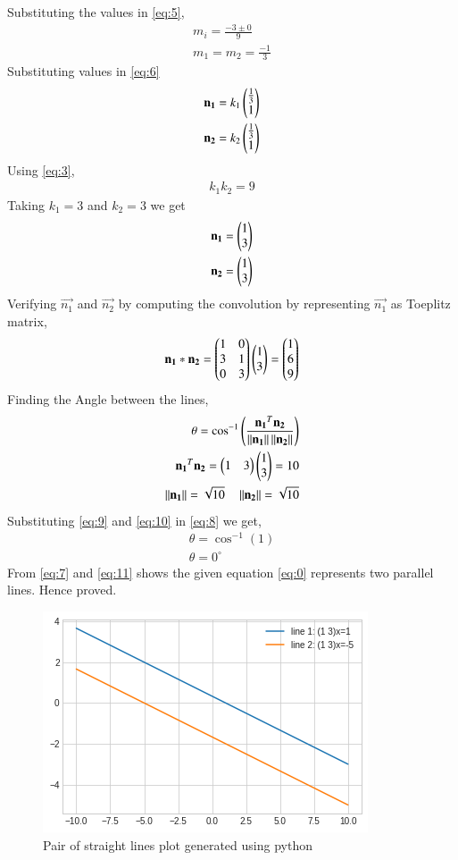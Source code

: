 \documentclass[journal,12pt,twocolumn]{IEEEtran}
\begin{document}
Substituting the values in \eqref{eq:5},
\begin{align}
m_i = \frac{-3\pm 0}{9}\\
m_1= m_2 = \frac{-1}{3} \label{eq:7}
\end{align}
Substituting values in \eqref{eq:6}
\begin{align}
\mathbf{n_1}=k_1\begin{pmatrix}\frac{1}{3}\\1\end{pmatrix}\\
\mathbf{n_2}=k_2\begin{pmatrix}\frac{1}{3}\\1\end{pmatrix}
\end{align}
Using \eqref{eq:3},
\begin{align}
k_1k_2 = 9
\end{align}
Taking $k_1=3$ and $k_2 = 3$ we get
\begin{align}
\mathbf{n_1}=\begin{pmatrix}1\\3\end{pmatrix}\\
\mathbf{n_2}=\begin{pmatrix}1\\3\end{pmatrix}
\end{align}
Verifying $\vec{n_1}$ and $\vec{n_2}$ by computing the convolution by representing $\vec{n_1}$ as Toeplitz matrix,
\begin{align}
\mathbf{n_1}*\mathbf{n_2}=\begin{pmatrix}1&0\\3&1\\0&3\end{pmatrix}\begin{pmatrix}1\\3\end{pmatrix}=\begin{pmatrix}1\\6\\9\end{pmatrix}
\end{align}
Finding the Angle between the lines,
\begin{align}
\theta = \cos^{-1}\left(\frac{\mathbf{n_1}^T\mathbf{n_2}}{\left\lVert\mathbf{n_1}\right\rVert\left\lVert\mathbf{n_2}\right\rVert}\right)\label{eq:8}\\
\mathbf{n_1}^T\mathbf{n_2} = \begin{pmatrix}1&3\end{pmatrix}\begin{pmatrix}1\\3\end{pmatrix} = 10 \label{eq:9}\\
\left\lVert\mathbf{n_1}\right\rVert = \sqrt{10}\quad \left\lVert\mathbf{n_2}\right\rVert=\sqrt{10} \label{eq:10}
\end{align}
Substituting \eqref{eq:9} and \eqref{eq:10} in \eqref{eq:8} we get,
\begin{align}
\theta = \cos^{-1}(1)\\
\theta = 0^{\circ}\label{eq:11}
\end{align}
From \eqref{eq:7} and \eqref{eq:11} shows the given equation \eqref{eq:0} represents two parallel lines. Hence proved.
\begin{figure}[!ht]
\centering
\includegraphics[width=\columnwidth]{Straight_lines.png}
\caption{Pair of straight lines plot generated using python}
\label{fig:plot}
\end{figure}
\end{document}
